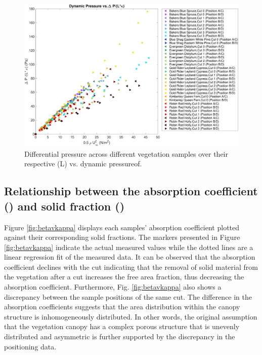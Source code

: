 \documentclass[12pt]{article}
\begin{document}
\begin{figure}[h] 
	\centering 	\includegraphics[width=0.9\linewidth]{DPoveraf(Overall_Ave).pdf}
	\caption{Differential pressure across different vegetation samples over their respective (\textkappa L) vs. dynamic pressureof.}
	\label{fig:DPoveraf(Overall)}
\end{figure}

\subsection{Relationship between the absorption coefficient (\textkappa) and solid fraction (\textbeta) }

Figure \ref{fig:betavkappa} displays each samples' absorption coefficient plotted against their corresponding solid fractions. The markers presented in Figure \ref{fig:betavkappa} indicate the actual measured values while the dotted lines are a linear regression fit of the measured data. It can be observed that the absorption coefficient declines with the cut indicating that the removal of solid material from the vegetation after a cut increases the free area fraction, thus decreasing the absorption coefficient. Furthermore, Fig. \ref{fig:betavkappa} also shows a discrepancy between the sample positions of the same cut. The difference in the absorption coefficients suggests that the area distribution within the canopy structure is inhomogeneously distributed. In other words, the original assumption that the vegetation canopy has a complex porous structure that is unevenly distributed and asymmetric is further supported by the discrepancy in the positioning data. 
\end{document}
